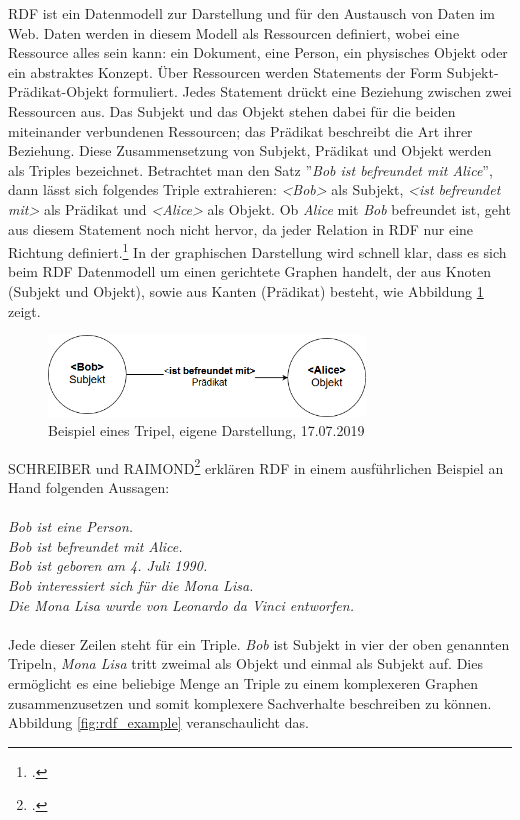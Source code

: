 \documentclass[12pt,a4paper]{article}
\begin{document}
RDF ist ein Datenmodell zur Darstellung und für den Austausch von Daten im Web. Daten werden in diesem Modell als Ressourcen definiert, wobei eine Ressource alles sein kann: ein Dokument, eine Person, ein physisches Objekt oder ein abstraktes Konzept. Über Ressourcen werden Statements der Form Subjekt-Prädikat-Objekt formuliert. Jedes Statement drückt eine Beziehung zwischen zwei Ressourcen aus. Das Subjekt und das Objekt stehen dabei für die beiden miteinander verbundenen Ressourcen; das Prädikat beschreibt die Art ihrer Beziehung. Diese Zusammensetzung von Subjekt, Prädikat und Objekt werden als Triples bezeichnet. Betrachtet man den Satz ''\textit{Bob ist befreundet mit Alice}'', dann lässt sich folgendes Triple extrahieren: \textit{<Bob>} als Subjekt, \textit{<ist befreundet mit>} als Prädikat und \textit{<Alice>} als Objekt. Ob \textit{Alice} mit \textit{Bob} befreundet ist, geht aus diesem Statement noch nicht hervor, da jeder Relation in RDF nur eine Richtung definiert.\footcite[][S.16-21]{powers2003practical} In der graphischen Darstellung wird schnell klar, dass es sich beim RDF Datenmodell um einen gerichtete Graphen handelt, der aus Knoten (Subjekt und Objekt), sowie aus Kanten (Prädikat) besteht, wie Abbildung \ref{fig:triple} zeigt.
\begin{figure}[H]
  \centering
	\includegraphics[width=0.75\textwidth]{img/triple.png}  
    \caption[Beispiel eines Tripel]{Beispiel eines Tripel, eigene Darstellung, 17.07.2019}
  	\label{fig:triple}
\end{figure}
SCHREIBER und RAIMOND\footcite[][]{schreiber2014rdf} erklären RDF in einem ausführlichen Beispiel an Hand folgenden Aussagen:
\\
\\
\textit{Bob ist eine Person.\\
Bob ist befreundet mit Alice.\\
Bob ist geboren am 4. Juli 1990. \\
Bob interessiert sich für die Mona Lisa.\\
Die Mona Lisa wurde von Leonardo da Vinci entworfen.}
\\
\\
Jede dieser Zeilen steht für ein Triple. \textit{Bob} ist Subjekt in vier der oben genannten Tripeln, \textit{Mona Lisa} tritt zweimal als Objekt und einmal als Subjekt auf. Dies ermöglicht es eine beliebige Menge an Triple zu einem komplexeren Graphen zusammenzusetzen und somit komplexere Sachverhalte beschreiben zu können. Abbildung \ref{fig:rdf_example} veranschaulicht das.
\end{document}
